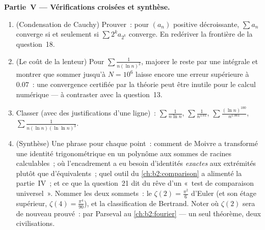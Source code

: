 \begin{problem}[{Problème du week-end --- $\zeta(2) = \pi^2/6$ et le
panorama de Bertrand}]
\medskip
\noindent\textbf{Partie~V --- Vérifications croisées et synthèse.}
\begin{enumerate}[resume]
  \item (Condensation de Cauchy) Prouver~: pour $(a_n)$ positive
        décroissante, $\sum a_n$ converge si et seulement si $\sum
        2^k a_{2^k}$ converge. En redériver la frontière de la
        question~18.
  \item (Le coût de la lenteur) Pour $\sum\frac1{n(\ln n)^2}$,
        majorer le reste par une intégrale et montrer que sommer
        jusqu'à $N = 10^6$ laisse encore une erreur supérieure à
        $0.07$~: une convergence certifiée par la théorie peut être
        inutile pour le calcul numérique --- à contraster avec la
        question~13.
  \item Classer (avec des justifications d'une ligne)~:
        $\sum\frac1{n\ln n}$, $\sum\frac1{n^{1.01}}$,
        $\sum\frac{(\ln n)^{100}}{n^{1.001}}$,
        $\sum\frac1{n(\ln n)(\ln\ln n)^{3}}$.
  \item (Synthèse) Une phrase pour chaque point~: comment de Moivre a
        transformé une identité trigonométrique en un polynôme aux
        sommes de racines calculables~; où l'encadrement a eu besoin
        d'identités \emph{exactes} aux extrémités plutôt que
        d'équivalents~; quel outil du \cref{ch:b2:comparison} a
        alimenté la partie~IV~; et ce que la question~21 dit du rêve
        d'un «~test de comparaison universel~». Nommer les deux
        sommets~: le $\zeta(2) = \frac{\pi^2}6$ d'Euler (et son étage
        supérieur, $\zeta(4) = \frac{\pi^4}{90}$), et la
        classification de Bertrand. Noter où $\zeta(2)$ sera de
        nouveau prouvé~: par Parseval au \cref{ch:b2:fourier} --- un
        seul théorème, deux civilisations.
\end{enumerate}
\end{problem}
